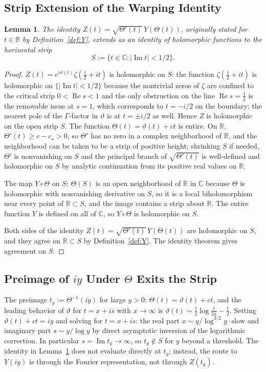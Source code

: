 \documentclass[11pt,a4paper]{article}
\theoremstyle{plain}
\newtheorem{lemma}[theorem]{Lemma}
\theoremstyle{definition}
\newcommand{\R}{\mathbb{R}}
\newcommand{\C}{\mathbb{C}}
\DeclareMathOperator{\Real}{Re}
\DeclareMathOperator{\Imag}{Im}
\begin{document}
\subsection{Strip Extension of the Warping Identity}

\begin{lemma}\label{lem:strip}
The identity $Z(t)=\sqrt{\Theta'(t)}\,Y(\Theta(t))$, originally stated for $t\in\R$ by Definition~\ref{def:Y}, extends as an identity of holomorphic functions to the horizontal strip
\[
S:=\{t\in\C:|\Imag t|<1/2\}.
\]
\end{lemma}

\begin{proof}
$Z(t)=e^{i\vartheta(t)}\zeta(\tfrac12+it)$ is holomorphic on $S$: the function $\zeta(\tfrac12+it)$ is holomorphic on $\{|\Imag t|<1/2\}$ because the nontrivial zeros of $\zeta$ are confined to the critical strip $0<\Real s<1$ and the only obstruction on the line $\Real s=\tfrac12$ is the removable issue at $s=1$, which corresponds to $t=-i/2$ on the boundary; the nearest pole of the $\Gamma$-factor in $\vartheta$ is at $t=\pm i/2$ as well. Hence $Z$ is holomorphic on the open strip $S$. The function $\Theta(t)=\vartheta(t)+ct$ is entire. On $\R$, $\Theta'(t)\ge c-c_\star>0$, so $\Theta'$ has no zero in a complex neighborhood of $\R$, and the neighborhood can be taken to be a strip of positive height; shrinking $S$ if needed, $\Theta'$ is nonvanishing on $S$ and the principal branch of $\sqrt{\Theta'(t)}$ is well-defined and holomorphic on $S$ by analytic continuation from its positive real values on $\R$.

The map $Y\circ\Theta$ on $S$: $\Theta(S)$ is an open neighborhood of $\R$ in $\C$ because $\Theta$ is holomorphic with nonvanishing derivative on $S$, so it is a local biholomorphism near every point of $\R\subset S$, and the image contains a strip about $\R$. The entire function $Y$ is defined on all of $\C$, so $Y\circ\Theta$ is holomorphic on $S$.

Both sides of the identity $Z(t)=\sqrt{\Theta'(t)}\,Y(\Theta(t))$ are holomorphic on $S$, and they agree on $\R\subset S$ by Definition~\ref{def:Y}. The identity theorem gives agreement on $S$.
\end{proof}

\subsection{Preimage of $iy$ Under $\Theta$ Exits the Strip}

The preimage $t_y:=\Theta^{-1}(iy)$ for large $y>0$: $\Theta(t)=\vartheta(t)+ct$, and the leading behavior of $\vartheta$ for $t=x+is$ with $x\to\infty$ is $\vartheta(t)\sim\tfrac{t}{2}\log\tfrac{t}{2\pi}-\tfrac{t}{2}$. Setting $\vartheta(t)+ct=iy$ and solving for $t=x+is$: the real part $x\sim y/\log^{3/2}y\cdot\text{slow}$ and imaginary part $s\sim y/\log y$ by direct asymptotic inversion of the logarithmic correction. In particular $s=\Imag t_y\to\infty$, so $t_y\notin S$ for $y$ beyond a threshold. The identity in Lemma~\ref{lem:strip} does not evaluate directly at $t_y$; instead, the route to $Y(iy)$ is through the Fourier representation, not through $Z(t_y)$.
\end{document}
